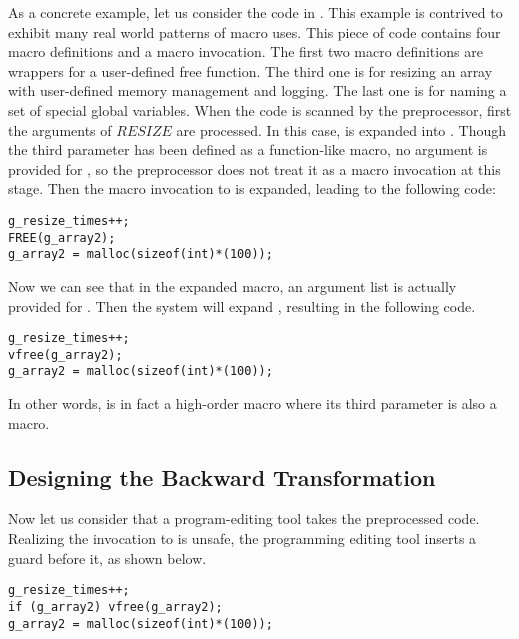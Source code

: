 As a concrete example, let us consider the code in
. This example is contrived to exhibit many real
world patterns of macro uses.  This piece of code contains four macro
definitions and a macro invocation. The first two macro definitions
are wrappers for a user-defined free function. The third one is for
resizing an array with user-defined memory management and logging. The last one is
for naming a set of special global variables.
When the code is scanned by the preprocessor, first the arguments of $RESIZE$ are processed. In
this case,  is expanded into . Though
the third parameter  has been defined as a function-like
macro, no argument is provided for , so the preprocessor
does not treat it as a macro invocation at this stage. Then the macro
invocation to  is expanded, leading to the following
code:
\begin{lstlisting}
g_resize_times++;
FREE(g_array2);
g_array2 = malloc(sizeof(int)*(100));
\end{lstlisting}
Now we
can see that in the expanded macro, an argument list is actually
provided for . Then the system will expand
, resulting in the following code. 
\begin{lstlisting}
g_resize_times++;
vfree(g_array2);
g_array2 = malloc(sizeof(int)*(100));
\end{lstlisting}
In
other words,  is in fact a high-order macro
where its third parameter is also a macro.

\subsection{Designing the Backward Transformation}
Now let us consider that a program-editing tool takes the preprocessed
code. Realizing the invocation to  is unsafe, the
programming editing tool inserts a guard before it, as
shown below.
\begin{lstlisting}
g_resize_times++;
if (g_array2) vfree(g_array2);
g_array2 = malloc(sizeof(int)*(100));
\end{lstlisting}


